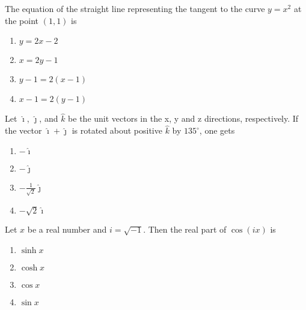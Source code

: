     \item{
        
           	The equation of the straight line representing the tangent to the curve \( y = x^2 \) at the point \((1,1)\) is
           	\begin{multicols}{4}
           		
				\begin{enumerate}
					\item \( y = 2x - 2 \)
					\item \( x = 2y - 1 \)
					\item \( y - 1 = 2(x - 1) \)
					\item \( x - 1 = 2(y - 1) \)
				\end{enumerate}
			\end{multicols}

        
        }
            \item{
        	
        	Let \(\hat{\imath}\), \(\hat{\jmath}\), and \(\hat{k}\) be the unit vectors in the x, y and z directions, respectively. If the vector \(\hat{\imath} + \hat{\jmath}\) is rotated about positive \(\hat{k}\) by \(135^\circ\), one gets
        	\begin{multicols}{4}
        		
        		\begin{enumerate}
        			\item \(-\hat{\imath}\) 
        			\item \(-\hat{\jmath}\) 
        			\item \(-\frac{1}{\sqrt{2}}\hat{\jmath}\) 
        			\item \(-\sqrt{2}\hat{\imath}\)
        		\end{enumerate}
        	\end{multicols}
        	
        	
        }
               \item{
   	
   	Let \( x \) be a real number and \( i = \sqrt{-1} \). Then the real part of \( \cos(ix) \) is
   	\begin{multicols}{4}
   		
   		\begin{enumerate}
   			\item \( \sinh x \)
   			\item \( \cosh x \)
   			\item \( \cos x \)
   			\item \( \sin x \)
   		\end{enumerate}
   	\end{multicols}
   	
   	
   }



